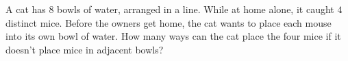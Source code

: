 A cat has $8$ bowls of water, arranged in a line. While at home alone, it caught $4$ distinct mice. Before the owners get home, the cat wants to place each mouse into its own bowl of water. How many ways can the cat place the four mice if it doesn't place mice in adjacent bowls?
